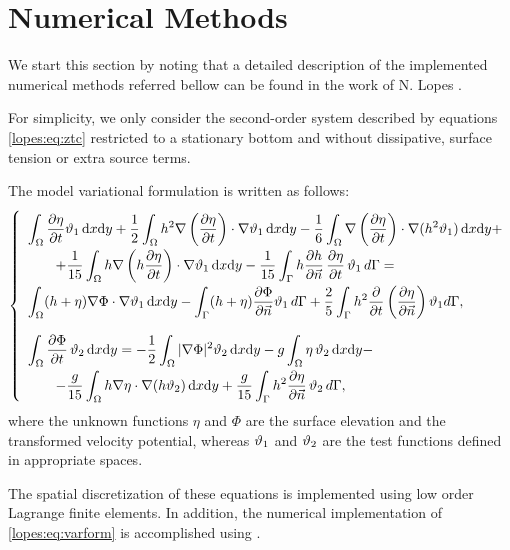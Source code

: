 
\section{Numerical Methods}
We start this section by noting that a detailed description
of  the implemented numerical methods referred bellow
can be found in the work of N. Lopes \cite{N.Lopes2007}.  

For simplicity, we only consider
the second-order system described by
equations \eqref{lopes:eq:ztc}  restricted to a stationary
bottom and without
dissipative, surface tension or extra source terms. 

The model variational formulation is written as follows:
\begin{equation}\label{lopes:eq:varform}
\renewcommand{\arraystretch}{2.0}
\left\{
\begin{array}{l}
\displaystyle \int_\Omega\fpar{\eta}{t}\fba\, \dx\dy
+\frac{1}{2}\int_\Omega
h^2\nabla\left(\fpar{\eta}{t}\right)\cdot\nabla\fba\, \dx\dy-
\frac{1}{6}\int_\Omega \nabla\left( \fpar{\eta}{t}\right)\cdot\nabla(h^2\fba)\, \dx\dy+\\
\quad \quad\displaystyle +
\frac{1}{15}\int_\Omega h\nabla\left(h\fpar{\eta}{t}\right)\cdot \nabla\fba\, \dx\dy-
\frac{1}{15}\int_\Gamma
h\fpar{h}{\vec{n}}\,\fpar{\eta}{t}\,\fba\, d\Gamma=
\quad\\\displaystyle 
\int_\Omega(h+\eta)\nabla\Phi\cdot\nabla\fba\, \dx\dy 
-\int_\Gamma(h+\eta)\fpar{\Phi}{\vec{n}}\fba\, d\Gamma
+\frac{2}{5}\int_\Gamma
h^2\fpar{}{t}\left(\fpar{\eta}{\vec{n}}\right)\fba d\Gamma,
\vspace{0.3cm} \\
\displaystyle \int_\Omega \fpar{\Phi}{t}\,\fbb\, \dx\dy= 
-\frac{1}{2}\int_\Omega|\nabla\Phi|^2\fbb\, \dx\dy
-g\int_\Omega \eta\,\fbb\, \dx\dy-
\\
\quad\quad\displaystyle-\frac{g}{15}\int_\Omega h\nabla\eta\cdot\nabla(h\fbb)\, \dx\dy +\frac{g}{15}\int_\Gamma h^2\fpar{\eta}{\vec{n}}\,\fbb\, d\Gamma,
\end{array}
\right .
\end{equation} 
where  the unknown functions
\(\eta\) and \(\Phi\) are the surface elevation and the
transformed velocity potential, whereas  \(\vartheta_1\) and \(\vartheta_2\)  
are the test functions defined in  appropriate spaces.  
  
The spatial  discretization of these equations
is implemented  using low order  Lagrange finite elements. 
In addition, the numerical implementation
of \eqref{lopes:eq:varform} is accomplished using  \ffc.

